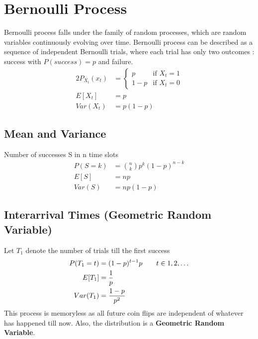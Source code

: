 \documentclass[../../probability-notes.tex]{subfiles}
\begin{document}
    \section{Bernoulli Process}
    Bernoulli process falls under the family of random processes, which are random variables continuously evolving over time. Bernoulli process can be described as a sequence of independent Bernoulli trials, where each trial has only two outcomes : success with $P(success) = p$ and failure.
    \begin{alignat*}{2}
        P_{X_{t}}(x_{t}) &= \begin{cases} p &\mbox{if $X_{t} = 1$}\\
                                        1-p &\mbox{if $X_{t} = 0$} \end{cases}\\
        E[X_{t}] &= p\\
        Var(X_{t}) &= p(1-p)
    \end{alignat*}

    \subsection{Mean and Variance}
    Number of successes S in n time slots
    \begin{align*}
        P(S=k) &= \binom{n}{k} p^{k}(1-p)^{n-k}\\
        E[S] &= np\\
        Var(S) &= np(1-p)
    \end{align*}

    \subsection{Interarrival Times (Geometric Random Variable)}
    Let $T_{1}$ denote the number of trials till the first success
    \begin{align*}
        P(T_{1} = t) &= (1-p)^{t-1}p \tag*{$t \in {1, 2, \ldots}$}\\
        E[T_{1}] &= \frac{1}{p}\\
        Var(T_{1}) &= \frac{1-p}{p^{2}}
    \end{align*}
    This process is memoryless as all future coin flips are independent of whatever has happened till now. Also, the distribution is a \textbf{Geometric Random Variable}.
\end{document}
